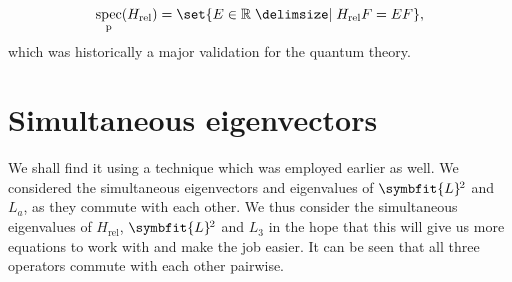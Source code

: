 \documentclass[12pt, a4 paper]{article}
\theoremstyle{definition}
\newcommand{\rr}{\mathbb{R}}
\DeclareMathOperator{\spec}{spec}
\newcommand{\lvecsquare}{\symbfit{L}\kern-1pt^2}
\begin{document}
	\begin{align*}
		\spec_{\text{p}}(H_\text{rel}) = \set{E \in \rr \given H_\text{rel} F = E F},
	\end{align*}
	which was historically a major validation for the quantum theory.

	\section{Simultaneous eigenvectors}

	We shall find it using a technique which was employed earlier as well. We considered the simultaneous eigenvectors and eigenvalues of $\lvecsquare$ and $L_a$, as they commute with each other. We thus consider the simultaneous eigenvalues of $H_\text{rel}$, $\lvecsquare$ and $L_3$ in the hope that this will give us more equations to work with and make the job easier. It can be seen that all three operators commute with each other pairwise.
\end{document}
